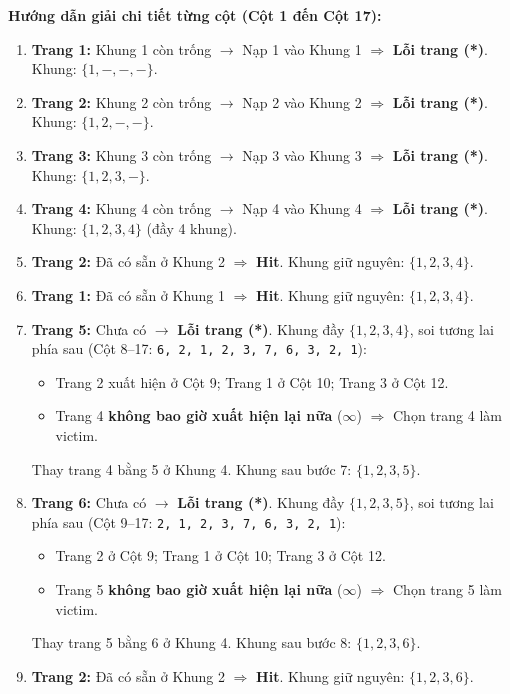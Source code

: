 \documentclass[11pt,a4paper]{article}
\begin{document}
\textbf{Hướng dẫn giải chi tiết từng cột (Cột 1 đến Cột 17):}
\begin{enumerate}[label=\textbf{Cột \arabic*:}, leftmargin=*, itemsep=2pt]
    \item \textbf{Trang 1:} Khung 1 còn trống $\rightarrow$ Nạp 1 vào Khung 1 $\Rightarrow$ \textbf{Lỗi trang (*)}. Khung: $\{1, -, -, -\}$.
    \item \textbf{Trang 2:} Khung 2 còn trống $\rightarrow$ Nạp 2 vào Khung 2 $\Rightarrow$ \textbf{Lỗi trang (*)}. Khung: $\{1, 2, -, -\}$.
    \item \textbf{Trang 3:} Khung 3 còn trống $\rightarrow$ Nạp 3 vào Khung 3 $\Rightarrow$ \textbf{Lỗi trang (*)}. Khung: $\{1, 2, 3, -\}$.
    \item \textbf{Trang 4:} Khung 4 còn trống $\rightarrow$ Nạp 4 vào Khung 4 $\Rightarrow$ \textbf{Lỗi trang (*)}. Khung: $\{1, 2, 3, 4\}$ (đầy 4 khung).
    \item \textbf{Trang 2:} Đã có sẵn ở Khung 2 $\Rightarrow$ \textbf{Hit}. Khung giữ nguyên: $\{1, 2, 3, 4\}$.
    \item \textbf{Trang 1:} Đã có sẵn ở Khung 1 $\Rightarrow$ \textbf{Hit}. Khung giữ nguyên: $\{1, 2, 3, 4\}$.
    \item \textbf{Trang 5:} Chưa có $\rightarrow$ \textbf{Lỗi trang (*)}. Khung đầy $\{1, 2, 3, 4\}$, soi tương lai phía sau (Cột 8--17: \texttt{6, 2, 1, 2, 3, 7, 6, 3, 2, 1}):
    \begin{itemize}[noitemsep]
        \item Trang 2 xuất hiện ở Cột 9; Trang 1 ở Cột 10; Trang 3 ở Cột 12.
        \item Trang 4 \textbf{không bao giờ xuất hiện lại nữa} ($\infty$) $\Rightarrow$ Chọn trang 4 làm victim.
    \end{itemize}
    Thay trang 4 bằng 5 ở Khung 4. Khung sau bước 7: $\{1, 2, 3, 5\}$.
    \item \textbf{Trang 6:} Chưa có $\rightarrow$ \textbf{Lỗi trang (*)}. Khung đầy $\{1, 2, 3, 5\}$, soi tương lai phía sau (Cột 9--17: \texttt{2, 1, 2, 3, 7, 6, 3, 2, 1}):
    \begin{itemize}[noitemsep]
        \item Trang 2 ở Cột 9; Trang 1 ở Cột 10; Trang 3 ở Cột 12.
        \item Trang 5 \textbf{không bao giờ xuất hiện lại nữa} ($\infty$) $\Rightarrow$ Chọn trang 5 làm victim.
    \end{itemize}
    Thay trang 5 bằng 6 ở Khung 4. Khung sau bước 8: $\{1, 2, 3, 6\}$.
    \item \textbf{Trang 2:} Đã có sẵn ở Khung 2 $\Rightarrow$ \textbf{Hit}. Khung giữ nguyên: $\{1, 2, 3, 6\}$.

\end{enumerate}
\end{document}
